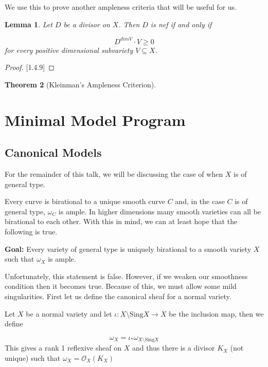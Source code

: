 \documentclass[a4paper]{article}
\newtheorem{theorem}{Theorem}
\newtheorem{lemma}[theorem]{Lemma}
\numberwithin{theorem}{section}
\begin{document}
We use this to prove another ampleness criteria that will be useful for us.

\begin{lemma}
Let $D$ be a divisor on $X$. Then $D$ is nef if and only if 

$$ D^{dim V}\cdot V \geq 0 $$
for every positive dimensional subvariety $V \subseteq X$.

\end{lemma}
\begin{proof}
\cite{MR2095471}[1.4.9]
\end{proof}

\begin{theorem}[Kleinman's Ampleness Criterion]\label{klein}


\end{theorem}

\section{Minimal Model Program}\label{mmp}

\subsection{Canonical Models}

For the remainder of this talk, we will be discussing the case of when $X$ is of general type.

Every curve is birational to a unique smooth curve $C$ and, in the case $C$ is of general type, $\omega_C$ is ample. In higher dimensions many smooth varieties can all be birational to each other. With this in mind, we can at least hope that the following is true.

\textbf{Goal:} Every variety of general type is uniquely birational to a smooth variety $X$ such that $\omega_X$ is ample.

Unfortunately, this statement is false. However, if we weaken our smoothness condition then it becomes true. Because of this, we must allow some mild singularities. First let us define the canonical sheaf for a normal variety.

Let $X$ be a normal variety and let $\iota: X \setminus \text{Sing} X \rightarrow X$ be the inclusion map, then we define 

$$\omega_X = \iota_* \omega_{X \setminus \text{Sing} X} $$
This gives a rank 1 reflexive sheaf on $X$ and thus there is a divisor $K_X$ (not unique) such that $\omega_X = \mathcal{O}_X(K_X)$
\end{document}
